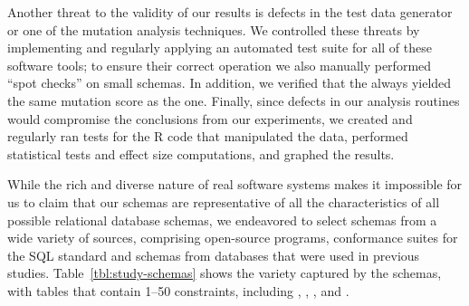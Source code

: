 

Another threat to the validity of our results is defects in the test data generator or one of the mutation analysis techniques. We controlled these threats by implementing and regularly applying an automated test suite for all of these software tools; to ensure their correct operation we also manually performed ``spot checks'' on small schemas. In addition, we verified that the \vma always yielded the same mutation score as the \Original one. Finally, since defects in our analysis routines would compromise the conclusions from our experiments, we created and regularly ran tests for the R code that manipulated the data, performed statistical tests and effect size computations, and graphed the results.


While the rich and diverse nature of real software systems makes it impossible for us to claim that our schemas are representative of all the characteristics of all possible relational database schemas, we endeavored to select schemas from a wide variety of sources, comprising open-source programs, conformance suites for the SQL standard and schemas from databases that were used in previous studies. Table~\ref{tbl:study-schemas} shows the variety captured by the schemas, with tables that contain 1--50 constraints, including \CHECKs, \FKs, \PKs, \NOTNULLs and \UNIQUEs.



